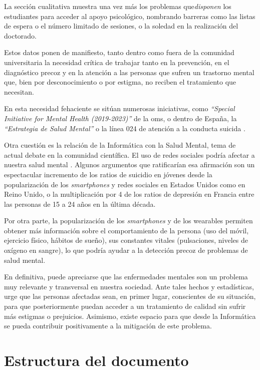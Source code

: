     La sección cualitativa muestra una vez más los problemas que\textit{disponen} los estudiantes para acceder al apoyo psicológico, nombrando barreras como las listas de espera o el número limitado de sesiones, o la soledad en la realización del doctorado.
    
    Estos datos ponen de manifiesto, tanto dentro como fuera de la comunidad universitaria la necesidad crítica de trabajar tanto en la prevención, en el diagnóstico precoz y en la atención a las personas que sufren un trastorno mental que, bien por desconocimiento o por estigma, no reciben el tratamiento que necesitan.
    
    En esta necesidad fehaciente se sitúan numerosas iniciativas, como \textit{``Special Initiative for Mental Health (2019-2023)''} \cite{oms_salud_nodate} de la \gls{oms}, o dentro de España, la \textit{``Estrategia de Salud Mental''} o la línea 024 de atención a la conducta suicida \cite{la_moncloa_minones_2023}.

    Otra cuestión es la relación de la Informática con la Salud Mental, tema de actual debate en la comunidad científica. El uso de redes sociales podría afectar a nuestra salud mental \cite{burn-murdoch_smartphones_2023}. Algunos argumentos que ratificarían esa afirmación son un espectacular incremento de los ratios de suicidio en jóvenes desde la popularización de los \textit{smartphones} y redes sociales en Estados Unidos como en Reino Unido, o la multiplicación por 4 de los ratios de depresión en Francia entre las personas de 15 a 24 años en la última década.
    
    Por otra parte, la popularización de los \textit{smartphones} y de los \glspl{wearable} permiten obtener más información sobre el comportamiento de la persona (uso del móvil, ejercicio físico, hábitos de sueño), sus constantes vitales (pulsaciones, niveles de oxígeno en sangre), lo que podría ayudar a la detección precoz de problemas de salud mental.
    
    En definitiva, puede apreciarse que las enfermedades mentales son un problema muy relevante y transversal en nuestra sociedad. Ante tales hechos y estadísticas, urge que las personas afectadas sean, en primer lugar, conscientes de su situación, para que posteriormente puedan acceder a un tratamiento de calidad sin sufrir más estigmas o prejuicios. Asimismo, existe espacio para que desde la Informática se pueda contribuir positivamente a la mitigación de este problema.
    

\section{Estructura del documento}

